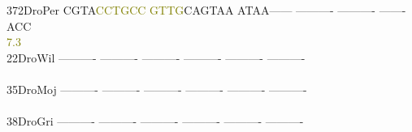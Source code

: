 \documentclass[11pt,twoside,reqno,a4paper]{article}
\begin{document}
{372\hspace*{2\charwidth}DroPer	CGTA\textcolor{olive}{C}\textcolor{olive}{C}\textcolor{olive}{T}\textcolor{olive}{G}\textcolor{olive}{C}\textcolor{olive}{C}	\textcolor{olive}{G}\textcolor{olive}{T}\textcolor{olive}{T}\textcolor{olive}{G}CAGTAA	ATAA------	----------	----------	-------ACC	\\
\hspace*{5\charwidth}\hspace*{7\charwidth}\hspace*{4\charwidth}\textcolor{olive}{7.3}\hspace*{1\charwidth}\hspace*{1\charwidth}\hspace*{1\charwidth}\hspace*{1\charwidth}\hspace*{1\charwidth}\hspace*{1\charwidth}\\
22\hspace*{3\charwidth}DroWil	----------	----------	----------	----------	----------	----------	\\
\hspace*{5\charwidth}\hspace*{7\charwidth}\hspace*{1\charwidth}\hspace*{1\charwidth}\hspace*{1\charwidth}\hspace*{1\charwidth}\hspace*{1\charwidth}\hspace*{1\charwidth}\\
35\hspace*{3\charwidth}DroMoj	----------	----------	----------	----------	----------	----------	\\
\hspace*{5\charwidth}\hspace*{7\charwidth}\hspace*{1\charwidth}\hspace*{1\charwidth}\hspace*{1\charwidth}\hspace*{1\charwidth}\hspace*{1\charwidth}\hspace*{1\charwidth}\\
38\hspace*{3\charwidth}DroGri	----------	----------	----------	----------	----------	----------	\\
\hspace*{5\charwidth}\hspace*{7\charwidth}\hspace*{1\charwidth}\hspace*{1\charwidth}\hspace*{1\charwidth}\hspace*{1\charwidth}\hspace*{1\charwidth}\hspace*{1\charwidth}\\
}
\end{document}

